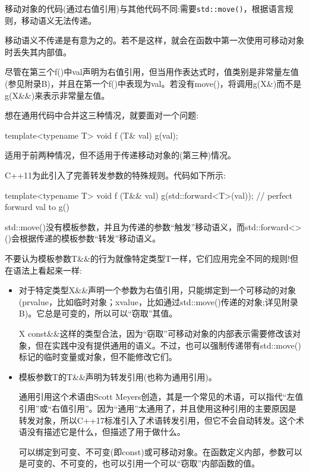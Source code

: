 移动对象的代码(通过右值引用)与其他代码不同:需要\texttt{std::move()}，根据语言规则，移动语义无法传递。

\begin{notice}
移动语义不传递是有意为之的。若不是这样，就会在函数中第一次使用可移动对象时丢失其内部值。
\end{notice}

尽管在第三个f()中val声明为右值引用，但当用作表达式时，值类别是非常量左值(参见附录B)，并且在第一个f()中表现为val。若没有move()，将调用g(X\&)而不是g(X\&\&)来表示非常量左值。

想在通用代码中合并这三种情况，就要面对一个问题:

\begin{cpp}
template<typename T>
void f (T& val) {
	g(val);
}
\end{cpp}

适用于前两种情况，但不适用于传递移动对象的(第三种)情况。

C++11为此引入了完善转发参数的特殊规则。代码如下所示:

\begin{cpp}
template<typename T>
void f (T&& val) {
	g(std::forward<T>(val)); // perfect forward val to g()
}
\end{cpp}

std::move()没有模板参数，并且为传递的参数“触发”移动语义，而std::forward<>()会根据传递的模板参数“转发”移动语义。

不要认为模板参数T\&\&的行为就像特定类型T一样，它们应用完全不同的规则!但在语法上看起来一样:

\begin{itemize}
\item 
对于特定类型X\&\&声明一个参数为右值引用，只能绑定到一个可移动的对象(prvalue，比如临时对象；xvalue，比如通过std::move()传递的对象;详见附录B)。它总是可变的，所以可以“窃取”其值。

\begin{notice}
X const\&\&这样的类型合法，因为“窃取”可移动对象的内部表示需要修改该对象，但在实践中没有提供通用的语义。不过，也可以强制传递带有std::move()标记的临时变量或对象，但不能修改它们。
\end{notice}

\item 
模板参数T的T\&\&声明为转发引用(也称为通用引用)。

\begin{notice}
通用引用这个术语由Scott Meyers创造，其是一个常见的术语，可以指代“左值引用”或“右值引用”。因为“通用”太通用了，并且使用这种引用的主要原因是转发对象，所以C++17标准引入了术语转发引用，但它不会自动转发。这个术语没有描述它是什么，但描述了用于做什么。
\end{notice}

可以绑定到可变、不可变(即const)或可移动对象。在函数定义内部，参数可以是可变的、不可变的，也可以引用一个可以“窃取”内部函数的值。
\end{itemize}

